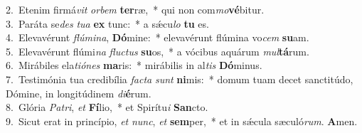 {2.~}Etenim firmá\textit{vit} \textit{or}\textit{bem} \textbf{ter}ræ,~* qui non com\textit{mo}\textbf{vé}bitur.\\
{3.~}Paráta se\textit{des} \textit{tu}\textit{a} \textbf{ex} tunc:~* a sǽcu\textit{lo} \textbf{tu} es.\\
{4.~}Elevavérunt \textit{flú}\textit{mi}\textit{na}, \textbf{Dó}mine:~* elevavérunt flúmina vo\textit{cem} \textbf{su}am.\\
{5.~}Elevavérunt flúmi\textit{na} \textit{flu}\textit{ctus} \textbf{su}os,~* a vócibus aquárum \textit{mul}\textbf{tá}rum.\\
{6.~}Mirábiles ela\textit{ti}\textit{ó}\textit{nes} \textbf{ma}ris:~* mirábilis in al\textit{tis} \textbf{Dó}minus.\\
{7.~}Testimónia tua credibília \textit{fa}\textit{cta} \textit{sunt} \textbf{ni}mis:~* domum tuam decet sanctitúdo, Dómine, in longitúdinem \textit{di}\textbf{é}rum.\\
{8.~}Glória \textit{Pa}\textit{tri}, \textit{et} \textbf{Fí}lio,~* et Spirítu\textit{i} \textbf{San}cto.\\
{9.~}Sicut erat in princípio, \textit{et} \textit{nunc}, \textit{et} \textbf{sem}per,~* et in sǽcula sæculó\textit{rum}. \textbf{A}men.\\
